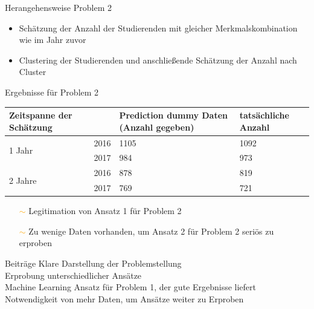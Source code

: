 \documentclass[17pt, fleqn]{beamer}
\begin{document}
\begin{frame}{Herangehensweise Problem 2}
    \begin{itemize}
        \item Schätzung der Anzahl der Studierenden mit gleicher Merkmalskombination wie im Jahr zuvor \\[1cm]
        \pause
        \item Clustering der Studierenden und anschließende Schätzung der Anzahl nach Cluster
    \end{itemize}
    
\end{frame}

\begin{frame}{Ergebnisse für Problem 2}
    \scriptsize{
    \begin{table}[ht]
        \begin{tabular}{ p{1cm} p{1cm} p{2.5cm} p{2cm} }
          Zeitspanne der Sch\"atzung &   & Prediction dummy Daten (Anzahl gegeben) & tats\"achliche Anzahl \\
          \hline
          \multirow{2}{3em}{1 Jahr}
                                     & 2016                   & 1105                                    & 1092                  \\
                                     & 2017                   & 984                                     & 973                   \\
          \hline
          \multirow{2}{4em}{2 Jahre}
                                     & 2016                   & 878                                     & 819                   \\
                                     & 2017                   & 769                                     & 721                   \\
          \hline
        \end{tabular}
      \end{table}
    } \pause
    \small{
    \begin{itemize}
        \item[\textcolor{orange}{$\sim$}] Legitimation von Ansatz 1 für Problem 2 \pause
        \item[\textcolor{orange}{$\sim$}] Zu wenige Daten vorhanden, um Ansatz 2 für Problem 2 seriös zu erproben
    \end{itemize}
    }
\end{frame}

\begin{frame}{Beiträge}
    \pause
    Klare Darstellung der Problemstellung \\[1cm]
    \pause
    Erprobung unterschiedlicher Ansätze \\[1cm]
    \pause
    Machine Learning Ansatz für Problem 1, der gute Ergebnisse liefert \\[1cm]
    \pause
    Notwendigkeit von mehr Daten, um Ansätze weiter zu Erproben
    
\end{frame}
\end{document}
